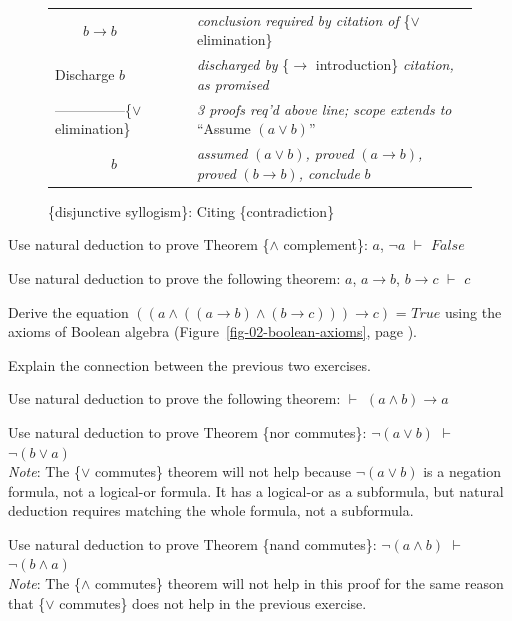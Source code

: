 {{\begin{figure}
\begin{center}
\begin{tabular}{ll}
~~~~$b \rightarrow b$ &\emph{conclusion required by citation of} \{$\vee$ elimination\}\\
Discharge $b$              & \emph{discharged by} \{$\rightarrow$ introduction\} \emph{citation, as promised}\\
---------------\{$\vee$ elimination\}       &\emph{3 proofs req'd above line; scope extends to} ``Assume $(a \vee b)$''\\
~~~~~~~~$b$        &\emph{assumed} $(a \vee b)$\emph{, proved} $(a \rightarrow b)$\emph{, proved} $(b \rightarrow b)$\emph{, conclude }$b$\\
\end{tabular}
\end{center}
\caption{\{disjunctive syllogism\}: Citing \{contradiction\}}
\label{fig:disjunctive-syllogism-nd}
\end{figure}

\begin{ExerciseList}

\Exercise
\label{thm:and-complement}
Use natural deduction to prove
Theorem \{$\wedge$ complement\}: $a$, $\neg a$ $\vdash$ $False$

\Exercise
Use natural deduction to prove the following theorem:
$a$, $a \rightarrow b$, $b \rightarrow c$ $\vdash$ $c$

\Exercise
Derive the equation
$((a \wedge ((a \rightarrow b) \wedge (b \rightarrow c))) \rightarrow c)$ = $True$
using the axioms of Boolean algebra
(Figure~\ref{fig-02-boolean-axioms}, page \pageref{fig-02-boolean-axioms}).

\Exercise
Explain the connection between the previous two exercises.

\Exercise
Use natural deduction to prove the following theorem:
$\vdash$ $(a \wedge b) \rightarrow a$

\Exercise
Use natural deduction to prove
Theorem \{nor commutes\}: $\neg (a \vee b)$ $\vdash$ $\neg (b \vee a)$\\
\emph{Note}: The \{$\vee$ commutes\} theorem will not help because
$\neg (a \vee b)$ is a negation formula, not a logical-or formula.
It has a logical-or as a subformula, but natural deduction
requires matching the whole formula, not a subformula.

\Exercise
Use natural deduction to prove
Theorem \{nand commutes\}: $\neg (a \wedge b)$ $\vdash$ $\neg (b \wedge a)$\\
\emph{Note}: The \{$\wedge$ commutes\} theorem will not help in this proof
for the same reason that \{$\vee$ commutes\} does not help
in the previous exercise.


\end{ExerciseList}}}
